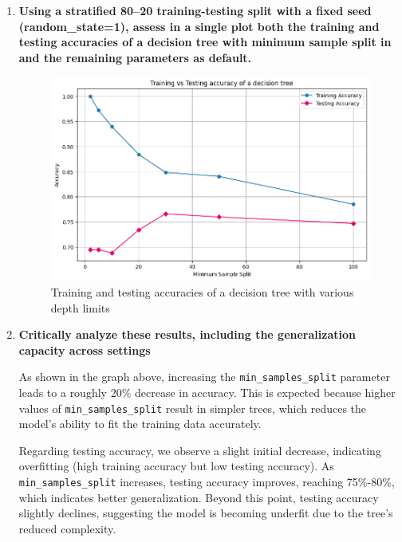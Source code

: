 \documentclass[12pt]{article}
\begin{document}
\begin{enumerate}[leftmargin=\labelsep,resume]
\vspace{0.5cm}

\item \textbf{Using a stratified 80--20 training-testing split with a fixed seed (random\_state=1),
assess in a single plot both the training and testing accuracies of a decision tree with
minimum sample split in and the remaining parameters as default.}

\vspace{1cm}



    \begin{figure}[H]
        \centering
          \includegraphics[width=12cm]{./Part II/2.png}
          \caption{Training and testing accuracies of a decision tree with various depth limits}
        \end{figure}

\vspace{0.5cm}

\item \textbf{Critically analyze these results, including the generalization capacity across settings}

\vspace{1cm}

As shown in the graph above, increasing the \texttt{min\_samples\_split} parameter leads to a roughly 20\% decrease in accuracy. This is expected because higher values of \texttt{min\_samples\_split} result in simpler trees, which reduces the model's ability to fit the training data accurately.

Regarding testing accuracy, we observe a slight initial decrease, indicating overfitting (high training accuracy but low testing accuracy). As \texttt{min\_samples\_split} increases, testing accuracy improves, reaching 75\%-80\%, which indicates better generalization. Beyond this point, testing accuracy slightly declines, suggesting the model is becoming underfit due to the tree's reduced complexity.


\end{enumerate}
\end{document}
